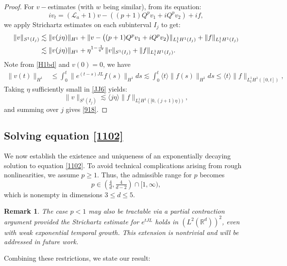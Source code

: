 \documentclass[12pt]{amsart}
\newcommand{\R}{\mathbb R}
\newcommand{\la}{\mathcal L_a}
\newtheorem{remark}[theorem]{Remark}
\begin{document}
\begin{proof}
   For $v-$estimates (with $w$ being similar), from its equation:
	$$
	iv_t=(\la+1) v-((p+1)Q^pv_1+iQ^pv_2)+if, 
	$$ 
we apply Strichartz estimates on each subinterval $I_j$ to get:
	\begin{align}
		\|v\|_{ S^1(I_j)} &\lesssim \|v(j\eta)\|_{H^1} + \|v-\bigl((p+1)Q^p v_1 +iQ^pv_2\bigr)\|_{L_t^1 H^1(I_j)}
                  +\|f\|_{L_t^1H^1(I_j)}\label{JJ6} \\
		&\lesssim \|v(j\eta)\|_{H^1} +\eta^{1-\frac 1{q^*}}\|v\|_{ S^1(I_j)} +\|f\|_{L_t^1H^1(I_j)}. \notag
	\end{align}
Note from \eqref{H1bd} and $v(0)=0$, we have
	\begin{align*}
		\|v(t)\|_{ H^1} &\le \int_0^t\|e^{(t-s)JL}f(s)\|_{H^1} ds 
		 \lesssim \int_0^t\langle t \rangle \|f(s)\|_{H^1} ds 
		\le \langle t \rangle \|f\|_{L_t^1H^1([0,t])},
	\end{align*}
Taking $\eta$ sufficiently small in \eqref{JJ6} yields:
	$$
	\|v\|_{S^1(I_j)} \lesssim  \langle j\eta \rangle  \|f\|_{L_t^1  H^1([0,(j+1)\eta))},
	$$
	and summing over $j$ gives \eqref{918}.
	\end{proof}

\subsection{Solving equation \eqref{1102}}\label{SS:stableM}

We now establish the existence and uniqueness of an exponentially decaying solution to equation \eqref{1102}. To avoid technical complications arising from rough nonlinearities, we assume $p\ge 1$. Thus, the admissible range for $p$ becomes 
\[ 
p\in (\tfrac 4d, \tfrac 4{d-2})\cap [1,\infty),
\]
which is nonempty in dimensions $3\le d\le 5$. 

\begin{remark}
The case $p<1$ may also be tractable via a partial contraction argument provided the Strichartz estimate for $e^{tJL}$ holds in $(L^2(\R^d))^2$, even with weak exponential temporal growth. This extension is nontrivial and will be addressed in future work. 
\end{remark}

Combining these restrictions, we state our result: 
\end{document}
